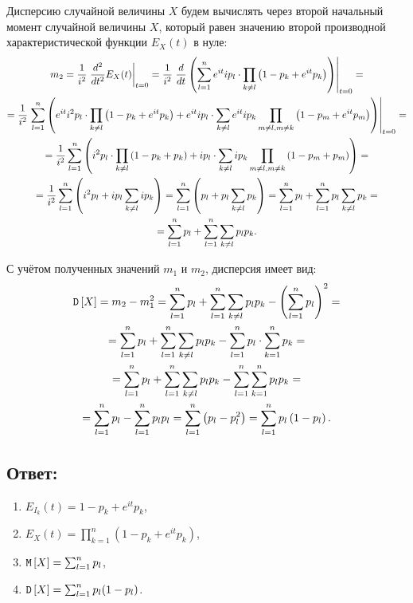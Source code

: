 Дисперсию случайной величины $X$ будем вычислять через второй начальный момент случайной величины $X$, который равен значению второй производной характеристической функции
$E_X(t)$ в нуле:
\begin{multline}
    m_2
    = \frac{1}{i^2} \left . \frac{d^{2}}{d{t}^{2}} E_X(t) \right |_{t=0}
    = \frac{1}{i^2} \left . \frac{d}{dt} \left ( \sum_{l=1}^n e^{it} i p_l \cdot \prod_{k \neq l} \left ( 1 - p_k + e^{it} p_k \right ) \right ) \right |_{t=0} = \\
    = \frac{1}{i^2}
    \left .
    \sum_{l=1}^n
    \left (
    e^{it} i^2 p_l \cdot \prod_{k \neq l} \left ( 1 - p_k + e^{it} p_k \right )
    + e^{it} i p_l \cdot \sum_{k \neq l} e^{it} i p_k \prod_{m \neq l, m \neq k} \left ( 1 - p_m + e^{it} p_m \right )
    \right )
    \right |_{t=0} = \\
    = \frac{1}{i^2}
    \sum_{l=1}^n
    \left (
    i^2 p_l \cdot \prod_{k \neq l} \left ( 1 - p_k + p_k \right )
    + i p_l \cdot \sum_{k \neq l} i p_k \prod_{m \neq l, m \neq k} \left ( 1 - p_m + p_m \right )
    \right ) = \\
    = \frac{1}{i^2} \sum_{l=1}^n \left ( i^2 p_l + i p_l \sum_{k \neq l} i p_k \right )
    = \sum_{l=1}^n \left ( p_l + p_l \sum_{k \neq l} p_k \right )
    = \sum_{l=1}^n p_l + \sum_{l=1}^n p_l \sum_{k \neq l} p_k = \\
    = \sum_{l=1}^n p_l + \sum_{l=1}^n \sum_{k \neq l} p_l p_k .
\end{multline}

С учётом полученных значений $m_1$ и $m_2$, дисперсия имеет вид:
\begin{multline}
    \mathtt{D} \left [ X \right ]
    = m_2 - m_1^2
    = \sum_{l=1}^n p_l + \sum_{l=1}^n \sum_{k \neq l} p_l p_k - \left ( \sum_{l=1}^n p_l \right )^2 = \\
    = \sum_{l=1}^n p_l + \sum_{l=1}^n \sum_{k \neq l} p_l p_k - \sum_{l=1}^n p_l \cdot \sum_{k=1}^n p_k = \\
    = \sum_{l=1}^n p_l + \sum_{l=1}^n \sum_{k \neq l} p_l p_k - \sum_{l=1}^n \sum_{k=1}^n p_l p_k = \\
    = \sum_{l=1}^n p_l - \sum_{l=1}^n p_l p_l
    = \sum_{l=1}^n \left ( p_l - p_l^2 \right )
    = \sum_{l=1}^n p_l \left ( 1 - p_l \right ).
\end{multline}

\subsection*{Ответ:}
\begin{enumerate}
    \item $E_{I_k}(t) = 1 - p_k + e^{it} p_k$,
    \item $E_X(t) = \prod_{k=1}^n \left ( 1 - p_k + e^{it} p_k \right )$,
    \item $\mathtt{M} \left [ X \right ] = \sum_{l=1}^n p_l$,
    \item $\mathtt{D} \left [ X \right ] = \sum_{l=1}^n p_l ( 1 - p_l )$.
\end{enumerate}

